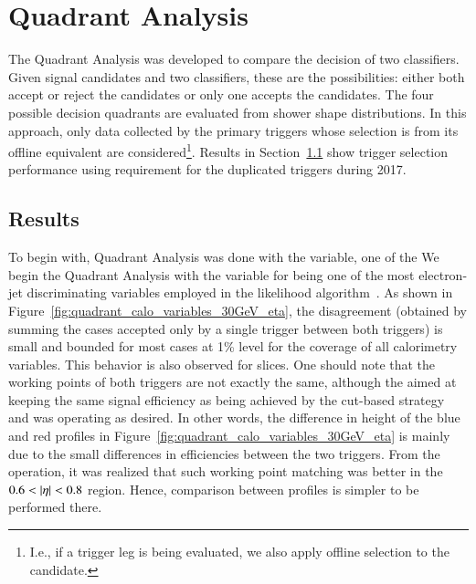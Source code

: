 \section{Quadrant Analysis}\label{ssec:quadrant}

The Quadrant Analysis was developed to compare the decision of two classifiers. Given signal candidates and two classifiers, these are the possibilities: either both accept or reject the candidates or only one accepts the candidates. The four possible decision quadrants are evaluated from shower shape distributions.
In this approach, only data collected by the primary triggers whose selection is from its offline equivalent are considered\footnote{I.e., if a \tight{} trigger leg is being evaluated, we also apply \tight{} offline selection to the candidate.}.
Results in Section~\ref{top:quadrant_results} show
trigger selection performance using \tight{} requirement for the duplicated triggers during 2017.

\subsection{Results}\label{top:quadrant_results}



To begin with, Quadrant Analysis was done with the \reta{} variable, one of the
We begin the Quadrant Analysis with the variable \reta{} for being one of the
most electron-jet discriminating variables employed in the likelihood
algorithm~\cite{aaboud2019electron}. As shown in Figure~\ref{fig:quadrant_calo_variables_30GeV_eta}, the disagreement (obtained by summing the cases accepted only by a single trigger between both triggers) is small and bounded for most cases at 1\% level for the coverage of all calorimetry variables. 
This behavior is also observed for \et{} slices. 
One should note that the working points of both triggers are not  exactly the same, although the \rnn{} aimed at keeping the same signal efficiency as being achieved by the cut-based strategy and was operating as desired.  
In other words, 
the difference in height of the blue and red profiles in Figure~\ref{fig:quadrant_calo_variables_30GeV_eta} is mainly due to the small differences in efficiencies between the two triggers.
From the operation, it was realized that such working point matching was better in the $0.6<\abseta{}<0.8$ region. Hence, comparison between profiles is simpler to be performed there.

